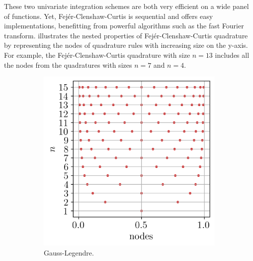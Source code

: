 These two univariate integration schemes are both very efficient on a wide panel of functions. 
Yet, Fejér-Clenshaw-Curtis is sequential and offers easy implementations, benefitting from powerful algorithms such as the fast Fourier transform. 
 illustrates the nested properties of Fejér-Clenshaw-Curtis quadrature by representing the nodes of quadrature rules with increasing size on the y-axis.  
For example, the Fejér-Clenshaw-Curtis quadrature with size $n=13$ includes all the nodes from the quadratures with sizes $n=7$ and $n=4$. 

\begin{figure}[ht]
    \centering
    \begin{subfigure}[b]{0.32\textwidth}
        \centering
        \includegraphics[width=\textwidth]{../numerical_experiments/chapter1/figures/univariate_gauss_legendre.png}
        \caption{Gauss-Legendre.}
    \end{subfigure}
    \quad
    \begin{subfigure}[b]{0.32\textwidth}
        \centering

\end{subfigure}
\end{figure}
